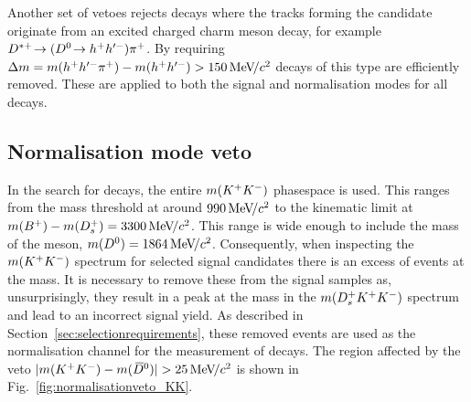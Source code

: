 Another set of vetoes rejects decays where the tracks forming the \Dsp candidate originate from an excited charged charm meson decay, for example ${{D}^{*+}}\!\rightarrow ({{D}^0}\!\rightarrow h^{+}h'^{-}) {{\pi}^+}$. By requiring $\Delta m = m(h^{+}h'^{-}{{\pi}^+})-m(h^{+}h'^{-}) > 150 {\mathrm{\,Me\kern -0.1em V\!/}c^2}$ decays of this type are efficiently removed. These are applied to both the signal and normalisation modes for all \Dsp decays. 


\subsection{Normalisation mode veto}
\label{sec:normvetos}

In the search for \decay{\Bp}{\Dsp\Kp\Km} decays, the entire $m({{K}^+}{{K}^-})$ phasespace is used. This ranges from the \Kp\Km mass threshold at around $990{\mathrm{\,Me\kern -0.1em V\!/}c^2}$ to the kinematic limit at $m({{{B}^+}}) - m({{D}^+_{s}}) = 3300{\mathrm{\,Me\kern -0.1em V\!/}c^2}$. This range is wide enough to include the mass of the \Dzb meson, $m({{D}^0}) = 1864 {\mathrm{\,Me\kern -0.1em V\!/}c^2}$. Consequently, when inspecting the $m({{K}^+}{{K}^-})$ spectrum for selected signal candidates there is an excess of events at the \Dz mass. It is necessary to remove these from the signal samples as, unsurprisingly, they result in a peak at the \Bp mass in the $m({{D}^+_{s}}{{K}^+}{{K}^-})$ spectrum and lead to an incorrect signal yield. As described in Section~\ref{sec:selectionrequirements}, these removed events are used as the normalisation channel for the measurement of \decay{\Bp}{\Dsp\Kp\Km} decays. 
The region affected by the veto $|m({{K}^+}{{K}^-}) - m({{\kern 0.2em\overline{\kern -0.2em D}{}}{}^0})| > 25 {\mathrm{\,Me\kern -0.1em V\!/}c^2}$ is shown in Fig.~\ref{fig:normalisationveto_KK}.

